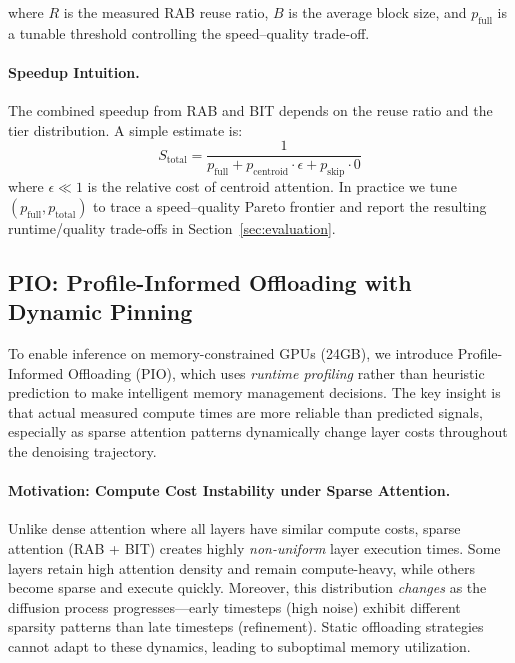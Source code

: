 where $R$ is the measured RAB reuse ratio, $B$ is the average block size, and $p_{\text{full}}$ is a tunable threshold controlling the speed--quality trade-off.

\paragraph{Speedup Intuition.}
The combined speedup from RAB and BIT depends on the reuse ratio and the tier distribution. A simple estimate is:
\begin{equation}
    S_{\text{total}} = \frac{1}{p_{\text{full}} + p_{\text{centroid}} \cdot \epsilon + p_{\text{skip}} \cdot 0}
\end{equation}
where $\epsilon \ll 1$ is the relative cost of centroid attention. In practice we tune $(p_{\text{full}}, p_{\text{total}})$ to trace a speed--quality Pareto frontier and report the resulting runtime/quality trade-offs in Section~\ref{sec:evaluation}.

\subsection{PIO: Profile-Informed Offloading with Dynamic Pinning}
\label{sec:offloading}

To enable inference on memory-constrained GPUs (24GB), we introduce Profile-Informed Offloading (PIO), which uses \textit{runtime profiling} rather than heuristic prediction to make intelligent memory management decisions. The key insight is that actual measured compute times are more reliable than predicted signals, especially as sparse attention patterns dynamically change layer costs throughout the denoising trajectory.

\paragraph{Motivation: Compute Cost Instability under Sparse Attention.}
Unlike dense attention where all layers have similar compute costs, sparse attention (RAB + BIT) creates highly \emph{non-uniform} layer execution times. Some layers retain high attention density and remain compute-heavy, while others become sparse and execute quickly. Moreover, this distribution \emph{changes} as the diffusion process progresses---early timesteps (high noise) exhibit different sparsity patterns than late timesteps (refinement). Static offloading strategies cannot adapt to these dynamics, leading to suboptimal memory utilization.

